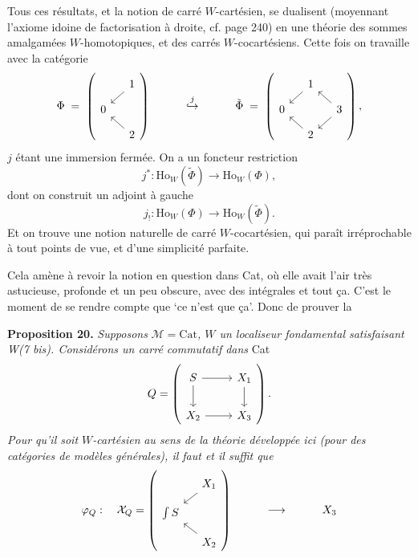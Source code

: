 \documentclass[11pt]{article}
\newcommand{\printedpage}[1]{\marginpar{\footnotesize p.~#1}}
\newcommand{\msp}[1]{\marginpar{\footnotesize [#1]}}
\newcommand{\Ho}{\mathrm{Ho}}
\begin{document}
\printedpage{170}

Tous ces résultats, et la notion de carré $W$-cartésien, se dualisent (moyennant l'axiome idoine de factorisation à droite, cf. page 240) en une théorie des sommes amalgamées $W$-homotopiques, et des carrés $W$-cocartésiens. Cette fois on travaille avec la catégorie
\[
\Phi \;=\; \left(
\begin{tikzcd}[ampersand replacement=\&, row sep=small, column sep=small]
 \& 1 \arrow[dl] \\
0 \& \\
 \& 2 \arrow[ul]
\end{tikzcd}
\right)
\qquad\quad \overset{j}{\hookrightarrow} \qquad\quad
\tilde{\Phi} \;=\; \left(
\begin{tikzcd}[ampersand replacement=\&, row sep=small, column sep=small]
 \& 1 \arrow[dl] \& \\
0 \& \& 3 \arrow[ul] \arrow[dl] \\
 \& 2 \arrow[ul] \&
\end{tikzcd}
\right),
\]
$j$ étant une immersion fermée. On a un foncteur restriction
\[
j^* : \Ho_W(\tilde{\Phi}) \longrightarrow \Ho_W(\Phi),
\]
dont on construit un adjoint à gauche
\[
j_! : \Ho_W(\Phi) \longrightarrow \Ho_W(\tilde{\Phi}).
\]
Et on trouve une notion naturelle de
\msp{page 262}
carré $W$-cocartésien, qui paraît irréprochable à tout points de vue, et d'une simplicité parfaite. %

Cela amène à revoir la notion en question dans Cat, où elle avait l'air très astucieuse, profonde et un peu obscure, avec des intégrales et tout ça. C'est le moment de se rendre compte que `ce n'est que ça'. Donc de prouver la

\textbf{Proposition 20.} \textit{Supposons} $\mathcal{M} = \mathrm{Cat}$\textit{, $W$ un localiseur fondamental satisfaisant W(7 bis). Considérons un carré commutatif dans} Cat
\[
Q = \left(
\begin{tikzcd}[ampersand replacement=\&]
S \arrow[r] \arrow[d] \& X_1 \arrow[d] \\
X_2 \arrow[r] \& X_3
\end{tikzcd}
\right).
\]
\textit{Pour qu'il soit $W$-cartésien} \textit{au sens de la théorie développée ici (pour des catégories de modèles générales), il faut et il suffit que}
\[
\varphi_Q : \quad \mathcal{X}_Q = \left(
\begin{tikzcd}[ampersand replacement=\&, row sep=small, column sep=small]
 \& X_1 \arrow[dl] \\
\int S \& \\
 \& X_2 \arrow[ul]
\end{tikzcd}
\right) \qquad\quad \longrightarrow \qquad\quad X_3
\]
\end{document}
